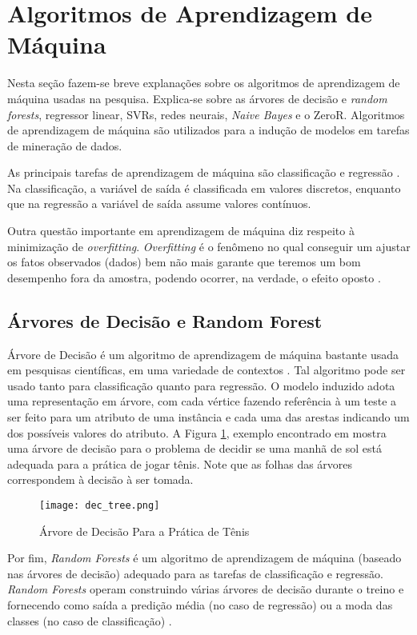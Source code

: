 \section{Algoritmos de Aprendizagem de Máquina}
Nesta seção fazem-se breve explanações sobre os algoritmos de aprendizagem de máquina
usadas na pesquisa. Explica-se sobre as árvores de decisão e \textit{random forests},
regressor linear, SVRs, redes neurais, \textit{Naive Bayes} e o ZeroR. 
Algoritmos de aprendizagem de máquina são utilizados para a indução de modelos em
tarefas de mineração de dados. 
\par As principais tarefas de aprendizagem de máquina são classificação e regressão
\cite{ml_second_book}. Na classificação, a variável de saída é classificada em
valores discretos, enquanto que na regressão a variável de saída assume valores
contínuos. 
\par Outra questão importante em aprendizagem de máquina diz respeito à minimização
de \textit{overfitting}. \textit{Overfitting} é o fenômeno no qual conseguir um
ajustar os fatos observados (dados) bem não mais garante que teremos um bom
desempenho fora da amostra, podendo ocorrer, na verdade, o efeito oposto
\cite{ml_second_book}.

\subsection{Árvores de Decisão e Random Forest}
Árvore de Decisão é um algoritmo de aprendizagem de máquina bastante usada em
pesquisas científicas, em uma variedade de contextos \cite{ml_mitchell}. Tal
algoritmo pode ser usado tanto para classificação quanto para regressão. O modelo
induzido adota uma representação em árvore, com cada vértice fazendo referência à um
teste a ser feito para um atributo de uma instância e cada uma das arestas indicando
um dos possíveis valores do atributo. A Figura \ref{dec_tree}, exemplo encontrado em
\cite{ml_mitchell} mostra uma árvore de decisão para o problema de decidir se uma
manhã de sol está adequada para a prática de jogar tênis. Note que as folhas das
árvores correspondem à decisão à ser tomada. 

\begin{figure}[!ht]
    \centering
    \texttt{[image: dec\_tree.png]}
    \caption{Árvore de Decisão Para a Prática de Tênis} 
    \label{dec_tree}
\end{figure}

\par Por fim, \textit{Random Forests} é um algoritmo de aprendizagem de máquina
(baseado nas árvores de decisão) adequado para as tarefas de classificação e
regressão. \textit{Random Forests} operam construindo várias árvores de decisão
durante o treino e fornecendo como saída a predição média (no caso de regressão) ou a
moda das classes (no caso de classificação) \cite{random_forest}. 

